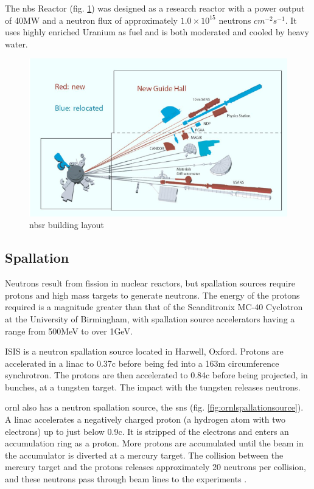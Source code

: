 The \acrlong{nbs} Reactor (fig. \ref{fig:nbsrbeamlines}) was designed as a research reactor with a power output of 40MW and a neutron flux of approximately $1.0 \times 10^{15}$ neutrons $cm^{-2} s^{-1}$.  It uses highly enriched Uranium as fuel and is both moderated and cooled by heavy water. 

\begin{figure}[ht]
\begin{center}
\includegraphics[width=.65\linewidth]{chapters/isotope_activation_and_radioactive_decay/images/nbsr.png}
\caption{\acrshort{nbsr} building layout\cite{nbsrhistory}}
\label{fig:nbsrbeamlines}
\end{center}
\end{figure}




\FloatBarrier
\subsection{Spallation}

Neutrons result from fission in nuclear reactors, but spallation sources require protons and high mass targets to generate neutrons.  The energy of the protons required is a magnitude greater than that of the Scanditronix MC-40 Cyclotron at the University of Birmingham, with spallation source accelerators having a range from 500MeV to over 1GeV.  

ISIS is a neutron spallation source located in Harwell, Oxford.  Protons are accelerated in a \acrshort{linac} to 0.37c before being fed into a 163m circumference synchrotron.  The protons are then accelerated to 0.84c before being projected, in bunches, at a tungsten target.  The impact with the tungsten releases neutrons\cite{isisneutronsource}.

\acrlong{ornl} also has a neutron spallation source, the \acrshort{sns} (fig. \ref{fig:ornlspallationsource}).  A \acrshort{linac} accelerates a negatively charged proton (a hydrogen atom with two electrons) up to just below 0.9c.  It is stripped of the electrons and enters an accumulation ring as a proton.  More protons are accumulated until the beam in the accumulator is diverted at a mercury target.  The collision between the mercury target and the protons releases approximately 20 neutrons per collision, and these neutrons pass through beam lines to the experiments . 

